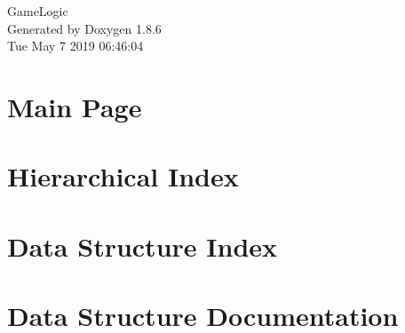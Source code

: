 \documentclass[twoside]{book}
\newcommand{\clearemptydoublepage}{%
  \newpage{\pagestyle{empty}\cleardoublepage}%
}
\begin{document}
\hypersetup{pageanchor=false}
\begin{titlepage}
\vspace*{7cm}
\begin{center}%
{\Large Game\-Logic }\\
\vspace*{1cm}
{\large Generated by Doxygen 1.8.6}\\
\vspace*{0.5cm}
{\small Tue May 7 2019 06:46:04}\\
\end{center}
\end{titlepage}
\clearemptydoublepage
\tableofcontents
\clearemptydoublepage
{}
\hypersetup{pageanchor=true}

\chapter{Main Page}
\label{index}\hypertarget{index}{}
\chapter{Hierarchical Index}

\chapter{Data Structure Index}

\chapter{Data Structure Documentation}




























\newpage
{}
{}
\printindex
\end{document}
